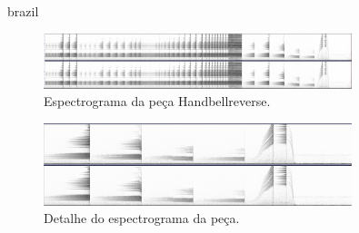 \begin{otherlanguage*}{brazil}
\begin{figure}
\centering
\includegraphics[width=0.8\textwidth]{pictures/cap4/handbellreverse}
\caption{\label{handbell}Espectrograma da peça Handbellreverse.}
\label{fig:handbell}
\end{figure}








\begin{figure}
\centering
\includegraphics[width=0.8\textwidth]{pictures/cap4/handbellreverse_detail}
\caption{\label{handbelldt}Detalhe do espectrograma da peça.}
\label{fig:handbelldt}
\end{figure}


\end{otherlanguage*}
